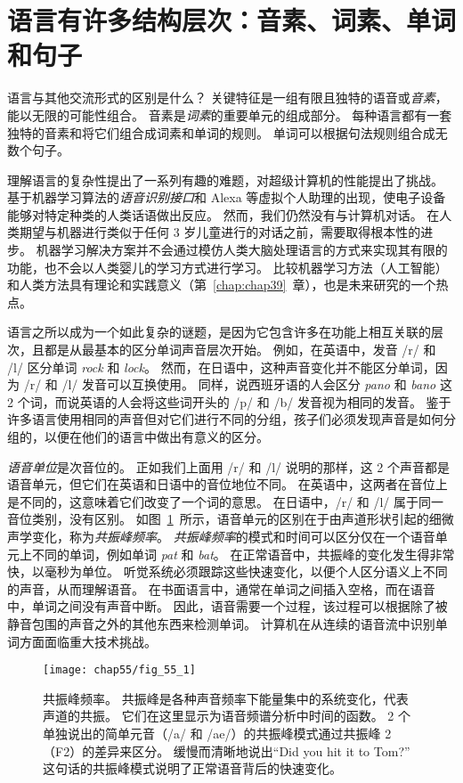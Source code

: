 \section{语言有许多结构层次：音素、词素、单词和句子}

语言与其他交流形式的区别是什么？
关键特征是一组有限且独特的语音或\textit{音素}，能以无限的可能性组合。
音素是\textit{词素}的重要单元的组成部分。
每种语言都有一套独特的音素和将它们组合成词素和单词的规则。
单词可以根据句法规则组合成无数个句子。


理解语言的复杂性提出了一系列有趣的难题，对超级计算机的性能提出了挑战。
基于机器学习算法的\textit{语音识别接口}和 Alexa 等虚拟个人助理的出现，使电子设备能够对特定种类的人类话语做出反应。
然而，我们仍然没有与计算机对话。
在人类期望与机器进行类似于任何 3 岁儿童进行的对话之前，需要取得根本性的进步。
机器学习解决方案并不会通过模仿人类大脑处理语言的方式来实现其有限的功能，也不会以人类婴儿的学习方式进行学习。
比较机器学习方法（人工智能）和人类方法具有理论和实践意义（第~\ref{chap:chap39}~章），也是未来研究的一个热点。


语言之所以成为一个如此复杂的谜题，是因为它包含许多在功能上相互关联的层次，且都是从最基本的区分单词声音层次开始。
例如，在英语中，发音 /r/ 和 /l/ 区分单词 \textit{rock} 和 \textit{lock}。
然而，在日语中，这种声音变化并不能区分单词，因为 /r/ 和 /l/ 发音可以互换使用。
同样，说西班牙语的人会区分 \textit{pano} 和 \textit{bano} 这 2 个词，而说英语的人会将这些词开头的 /p/ 和 /b/ 发音视为相同的发音。
鉴于许多语言使用相同的声音但对它们进行不同的分组，孩子们必须发现声音是如何分组的，以便在他们的语言中做出有意义的区分。


\textit{语音单位}是次音位的。
正如我们上面用 /r/ 和 /l/ 说明的那样，这 2 个声音都是语音单元，但它们在英语和日语中的音位地位不同。
在英语中，这两者在音位上是不同的，这意味着它们改变了一个词的意思。
在日语中，/r/ 和 /l/ 属于同一音位类别，没有区别。
如图~\ref{fig:55_1}~所示，语音单元的区别在于由声道形状引起的细微声学变化，称为\textit{共振峰频率}。
\textit{共振峰频率}的模式和时间可以区分仅在一个语音单元上不同的单词，例如单词 \textit{pat} 和 \textit{bat}。
在正常语音中，共振峰的变化发生得非常快，以毫秒为单位。
听觉系统必须跟踪这些快速变化，以便个人区分语义上不同的声音，从而理解语音。
在书面语言中，通常在单词之间插入空格，而在语音中，单词之间没有声音中断。
因此，语音需要一个过程，该过程可以根据除了被静音包围的声音之外的其他东西来检测单词。
计算机在从连续的语音流中识别单词方面面临重大技术挑战。


\begin{figure}[htbp]
	\centering
	\texttt{[image: chap55/fig\_55\_1]}
	\caption{共振峰频率。
	共振峰是各种声音频率下能量集中的系统变化，代表声道的共振。
	它们在这里显示为语音频谱分析中时间的函数。
	2 个单独说出的简单元音（/a/ 和 /ae/）的共振峰模式通过共振峰 2（F2）的差异来区分。
	缓慢而清晰地说出“Did you hit it to Tom?”
	这句话的共振峰模式说明了正常语音背后的快速变化。}
	\label{fig:55_1}
\end{figure}


